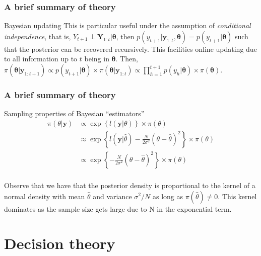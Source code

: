 \documentclass[12pt, compress]{beamer}
\begin{document}
\begin{frame}
	\frametitle{A brief summary of theory}
	
	\begin{block}{Bayesian updating}
	This is particular useful under the assumption of \textit{conditional independence}, that is, $Y_{t+1}\perp\boldsymbol{Y}_{1:t}|\boldsymbol{\theta}$, then $p(y_{t+1}|\boldsymbol{y}_{1:t},\boldsymbol{\theta})=p(y_{t+1}|\boldsymbol{\theta})$ such that the posterior can be recovered recursively. This facilities online updating due to all information up to $t$ being in $\boldsymbol{\theta}$. Then, $\pi(\boldsymbol{\theta}|\boldsymbol{y}_{1:t+1})\propto p(y_{t+1}|\boldsymbol{\theta})\times \pi(\boldsymbol{\theta}|\boldsymbol{y}_{1:t})\propto\prod_{h=1}^{t+1} p(y_h|\boldsymbol{\theta})\times \pi(\boldsymbol{\theta})$.
	\end{block}	

	
\end{frame}

\begin{frame}
	\frametitle{A brief summary of theory}
	
	\begin{block}{Sampling properties of Bayesian ``estimators''}
		\begin{align*}
		\pi(\theta|\boldsymbol{y})&\propto \exp\left\{{l}(\boldsymbol{y}|\theta)\right\} \times \pi(\theta)\\
		&\approx \exp\left\{{l}(\boldsymbol{y}|\hat{\theta})-\frac{N}{2\sigma^2}(\theta-\hat{\theta})^2\right\} \times \pi(\theta)\\
		&\propto \exp\left\{-\frac{N}{2\sigma^2}(\theta-\hat{\theta})^2\right\} \times \pi(\theta)\\ 
		\end{align*}
	\end{block}	
Observe that we have that the posterior density is proportional to the kernel of a normal density with mean $\hat{\theta}$ and variance $\sigma^2/N$ as long as $\pi(\hat{\theta})\neq 0$. This kernel dominates as the sample size gets large due to N in the exponential term.
\end{frame}

\section{Decision theory}
\end{document}
